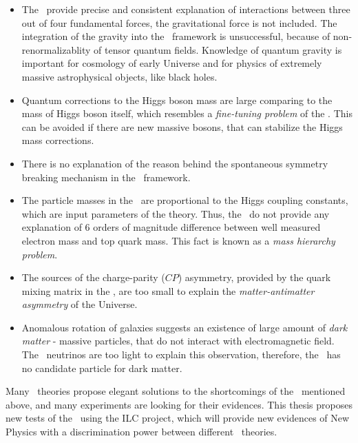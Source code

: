 \begin{itemize}
\item The \sm\ provide precise and consistent explanation of interactions between three out of four fundamental forces, the gravitational force is not included. The integration of the gravity into the \sm\ framework is unsuccessful, because of non-renormalizablity of tensor quantum fields. Knowledge of quantum gravity is important for cosmology of early Universe and for physics of extremely massive astrophysical objects, like black holes.
\item Quantum corrections to the Higgs boson mass are large comparing to the mass of Higgs boson itself, which resembles a \textit{fine-tuning problem} of the \sm. This can be avoided if there are new massive bosons, that can stabilize the Higgs mass corrections.
\item There is no explanation of the reason behind the spontaneous symmetry breaking mechanism in the \sm\ framework. 

\item The particle masses in the \sm\ are proportional to the Higgs coupling constants, which are input parameters of the theory. Thus, the \sm\ do not provide any explanation of 6 orders of magnitude difference between well measured electron mass and top quark mass. This fact is known as a \textit{mass hierarchy problem}.

\item The sources of the charge-parity ($CP$) asymmetry, provided by the quark mixing matrix in the \sm, are too small to explain the \textit{matter-antimatter asymmetry} of the Universe.
\item Anomalous rotation of galaxies suggests an existence of large amount of \textit{dark matter} - massive particles, that do not interact with electromagnetic field. The \sm\ neutrinos are too light to explain this observation, therefore, the \sm\ has no candidate particle for dark matter. 

\end{itemize}



Many \bsm\ theories propose elegant solutions to the shortcomings of the \sm\ mentioned above, and many experiments are looking for their evidences. 
This thesis proposes new tests of the \sm\ using the ILC project, which will provide new evidences of New Physics with a discrimination power between different \bsm\ theories.


